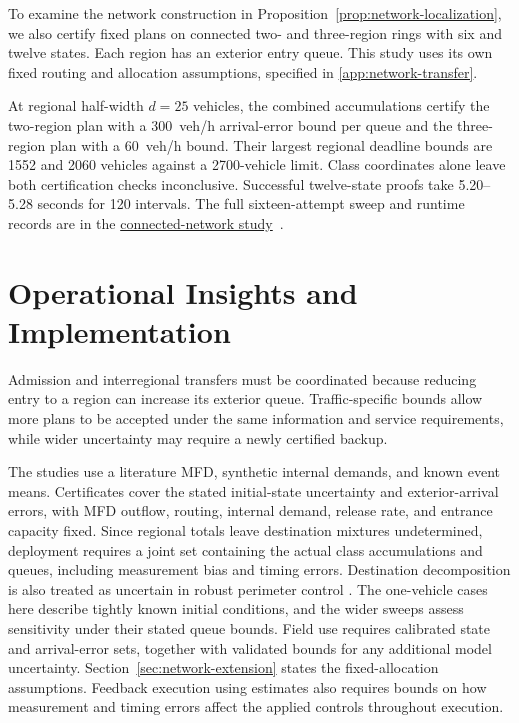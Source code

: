 \documentclass[preprint,12pt]{elsarticle}
\theoremstyle{definition}
\theoremstyle{plain}
\theoremstyle{definition}
\theoremstyle{plain}
\newcommand{\appref}[1]{\ref{#1}}
\newcommand{\reproductiondetails}[1]{\href{https://github.com/AlienEslami/agentic-perimeter-runtime-certification/releases/tag/paper-2026-11-10}{#1}~\cite{perimeterReproductionGuide}}
\begin{document}
To examine the network construction in
Proposition~\ref{prop:network-localization}, we also certify fixed plans
on connected two- and three-region rings with six and twelve states.
Each region has an exterior entry queue. This study uses its own fixed
routing and allocation assumptions, specified in
\appref{app:network-transfer}.

At regional half-width $d=25$ vehicles, the combined accumulations certify
the two-region plan with a 300~veh/h arrival-error bound per queue and the
three-region plan with a 60~veh/h bound. Their largest regional deadline
bounds are 1552 and 2060 vehicles against a 2700-vehicle limit.
Class coordinates alone leave both certification checks inconclusive.
Successful twelve-state proofs take 5.20--5.28 seconds for 120 intervals.
The full sixteen-attempt sweep and runtime records are in the
\reproductiondetails{connected-network study}.



\section{Operational Insights and Implementation}
\label{sec:new-discussion}
\label{sec:information-model-scope}

Admission and interregional transfers must
be coordinated because reducing entry to a region can increase its
exterior queue. Traffic-specific bounds allow more plans to be accepted
under the same information and service requirements, while wider
uncertainty may require a newly certified backup.

The studies use a literature MFD, synthetic internal demands, and known
event means. Certificates cover the stated initial-state uncertainty and
exterior-arrival errors, with MFD outflow, routing, internal demand, release rate,
and entrance capacity fixed. Since regional totals leave destination mixtures
undetermined, deployment requires a joint set containing the actual
class accumulations and queues, including measurement bias and timing
errors. Destination decomposition is also treated as uncertain in robust
perimeter control \cite{haddad2015robust}. The one-vehicle cases here
describe tightly known initial conditions, and the wider sweeps assess
sensitivity under their stated queue bounds. Field use requires calibrated
state and arrival-error sets, together with validated bounds for any
additional model uncertainty. Section~\ref{sec:network-extension} states
the fixed-allocation assumptions. Feedback execution using estimates
also requires bounds on how measurement and timing errors affect the
applied controls throughout execution.
\end{document}
